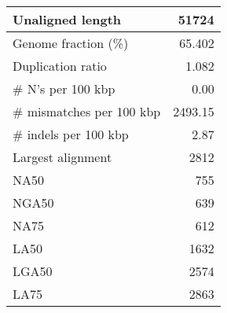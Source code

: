 \documentclass[12pt,a4paper]{article}
\begin{document}
\begin{table}[ht]
\begin{center}
\begin{tabular}{|l*{1}{|r}|}
Unaligned length & 51724 \\ \hline
Genome fraction (\%) & 65.402 \\ \hline
Duplication ratio & 1.082 \\ \hline
\# N's per 100 kbp & 0.00 \\ \hline
\# mismatches per 100 kbp & 2493.15 \\ \hline
\# indels per 100 kbp & 2.87 \\ \hline
Largest alignment & 2812 \\ \hline
NA50 & 755 \\ \hline
NGA50 & 639 \\ \hline
NA75 & 612 \\ \hline
LA50 & 1632 \\ \hline
LGA50 & 2574 \\ \hline
LA75 & 2863 \\ \hline
\end{tabular}
\end{center}
\end{table}
\end{document}
